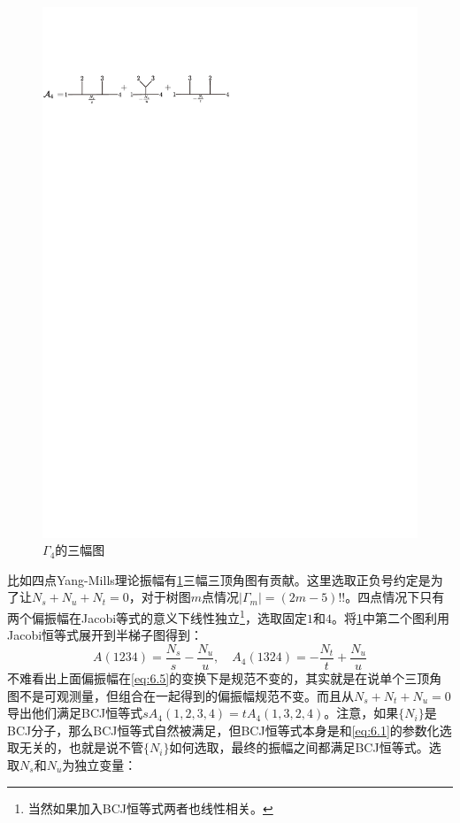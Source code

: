 \begin{figure}[htbp]
	\centering
	\includegraphics[width=0.90\linewidth]{figs/fig12.pdf}
	\caption{$\Gamma_4$的三幅图}
	\label{fig:6.5}
\end{figure}
比如四点Yang-Mills理论振幅有\ref{fig:6.5}三幅三顶角图有贡献。这里选取正负号约定是为了让$N_s+N_u+N_t=0$，对于树图$m$点情况$|\Gamma_m|=(2m-5)!!$。四点情况下只有两个偏振幅在Jacobi等式的意义下线性独立\footnote{当然如果加入BCJ恒等式两者也线性相关。}，选取固定$1$和$4$。将\ref{fig:6.5}中第二个图利用Jacobi恒等式展开到半梯子图得到：
\begin{equation}
	A(1234) = \frac{N_s}{s}-\frac{N_u}{u},\quad A_4(1324)=-\frac{N_t}{t}+\frac{N_u}{u}
\end{equation}
不难看出上面偏振幅在\ref{eq:6.5}的变换下是规范不变的，其实就是在说单个三顶角图不是可观测量，但组合在一起得到的偏振幅规范不变。而且从$N_s+N_t+N_u=0$导出他们满足BCJ恒等式$sA_4(1,2,3,4)=tA_4(1,3,2,4)$。注意，如果$\{N_i\}$是BCJ分子，那么BCJ恒等式自然被满足，但BCJ恒等式本身是和\ref{eq:6.1}的参数化选取无关的，也就是说不管$\{N_i\}$如何选取，最终的振幅之间都满足BCJ恒等式。选取$N_s$和$N_u$为独立变量：
